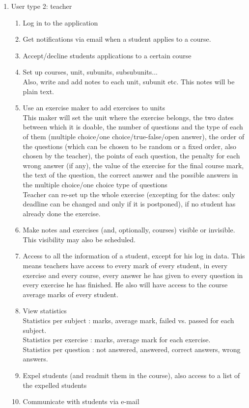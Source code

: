 \documentclass{article}
\begin{document}
\begin{enumerate}
\begin{enumerate}
\begin{enumerate}
\begin{enumerate}
			\end{enumerate}
			\item User type 2: teacher
			\begin{enumerate}
				\item Log in to the application\\
				\item Get notifications via email when a student applies to a course.
				\item Accept/decline students applications to a certain course\\
				\item Set up courses, unit, subunits, subsubunits...\\
				Also, write and add  notes to each unit, subunit etc. This notes will be plain text.\\
				\item Use an exercise maker to add exercises to units\\
				This maker will set the unit where the exercise belongs, the two dates between which it is doable, the number of questions and the type of each of them (multiple choice/one choice/true-false/open answer), the order of the questions (which can be chosen to be random or a fixed order, also chosen by the teacher), the points of each question, the penalty for each wrong answer (if any), the value of the exercise for the final course mark, the text of the question, the correct answer and the possible answers in the multiple choice/one choice type of questions\\
				Teacher can re-set up the whole exercise (excepting for the dates: only deadline can be changed and only if it is postponed), if no student has already done the exercise.\\
				\item Make notes and exercises (and, optionally, courses) visible or invisible. This visibility may also be scheduled.
				\item Access to all the information of a student, except for his log in data. This means teachers have access to every mark of every student, in every exercise and every course, every answer he has given to every question in every exercise he has finished. He also will have access to the course average marks of every student.
				\item View statistics\\
				Statistics per subject : marks, average mark, failed vs. passed for each subject.\\
				Statistics per exercise : marks, average mark for each exercise.\\
				Statistics per question : not answered, answered, correct answers, wrong answers.\\
				\item Expel students (and readmit them in the course), also access to a list of the expelled students\\
				\item Communicate with students via e-mail\\
				

\end{enumerate}
\end{enumerate}
\end{enumerate}
\end{enumerate}
\end{document}
